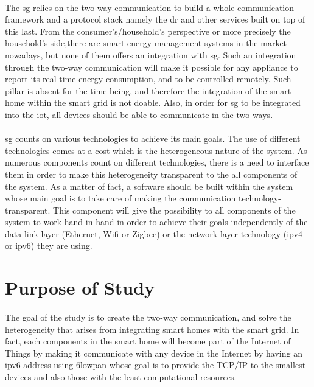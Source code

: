 \documentclass[12pt,a4paper,final]{report}
\begin{document}
\paragraph{}
The \gls{sg} relies on the two-way communication to build a whole communication framework and a protocol stack namely the \gls{dr} and other services built on top of this last. From the consumer's/household's perspective or more precisely the household's side,there are smart energy management systems in the market nowadays, but none of them offers an integration with \gls{sg}. Such an integration through the two-way communication will make it possible for any appliance to report its real-time energy consumption, and to be controlled remotely. Such pillar is absent for the time being, and therefore the integration of the smart home within the smart grid is not doable. Also, in order for \gls{sg} to be integrated into the \gls{iot}, all devices should be able to communicate in the two ways.
\paragraph{}
\gls{sg} counts on various technologies to achieve its main goals. The use of different technologies comes at a cost which is the heterogeneous nature of the system. As numerous components count on different technologies, there is a need to interface them in order to make this heterogeneity transparent to the all components of the system. As a matter of fact, a software should be built within the system whose main goal is to take care of making the communication technology-transparent. This component will give the possibility to all components of the system to work hand-in-hand in order to achieve their goals independently of the data link layer (Ethernet, Wifi or Zigbee) or the network layer technology (\gls{ipv4} or \gls{ipv6}) they are using.

\section{Purpose of Study}
 \paragraph{}
The goal of the study is to create the two-way communication, and solve the heterogeneity that arises from integrating smart homes with the smart grid. In fact, each components in the smart home will become part of the Internet of Things by making it communicate with any device in the Internet by having an \gls{ipv6} address using \gls{6lowpan} whose goal is to provide the TCP/IP to the smallest devices and also those with the least computational resources.
\end{document}
